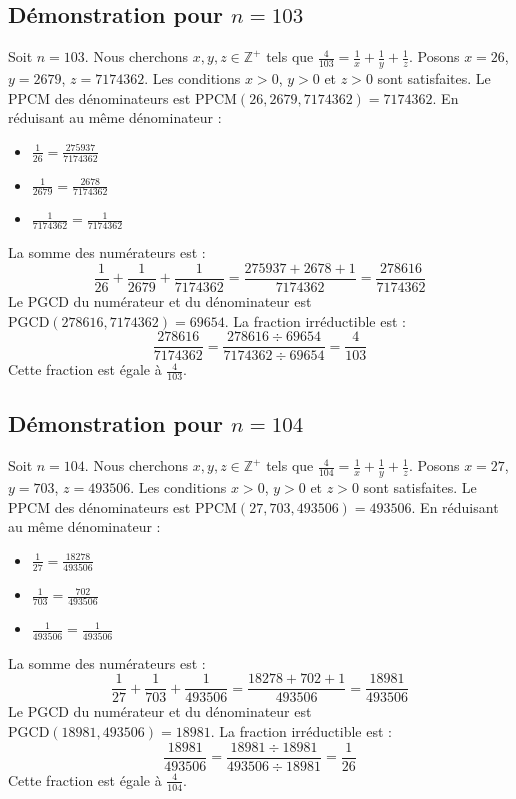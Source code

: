 \documentclass[11pt,a4paper]{article}
\begin{document}
\subsection{Démonstration pour $n = 103$}
Soit $n = 103$. Nous cherchons $x, y, z \in \mathbb{Z}^{+}$ tels que $\frac{4}{103} = \frac{1}{x} + \frac{1}{y} + \frac{1}{z}$.
Posons $x = 26$, $y = 2679$, $z = 7174362$.
Les conditions $x > 0$, $y > 0$ et $z > 0$ sont satisfaites.
Le PPCM des dénominateurs est $\text{PPCM}(26, 2679, 7174362) = 7174362$.
En réduisant au même dénominateur :
\begin{itemize}
    \item $\frac{1}{26} = \frac{275937}{7174362}$
    \item $\frac{1}{2679} = \frac{2678}{7174362}$
    \item $\frac{1}{7174362} = \frac{1}{7174362}$
\end{itemize}
La somme des numérateurs est :
$$ \frac{1}{26} + \frac{1}{2679} + \frac{1}{7174362} = \frac{275937 + 2678 + 1}{7174362} = \frac{278616}{7174362} $$
Le PGCD du numérateur et du dénominateur est $\text{PGCD}(278616, 7174362) = 69654$.
La fraction irréductible est :
$$ \frac{278616}{7174362} = \frac{278616 \div 69654}{7174362 \div 69654} = \frac{4}{103} $$
Cette fraction est égale à $\frac{4}{103}$.

\subsection{Démonstration pour $n = 104$}
Soit $n = 104$. Nous cherchons $x, y, z \in \mathbb{Z}^{+}$ tels que $\frac{4}{104} = \frac{1}{x} + \frac{1}{y} + \frac{1}{z}$.
Posons $x = 27$, $y = 703$, $z = 493506$.
Les conditions $x > 0$, $y > 0$ et $z > 0$ sont satisfaites.
Le PPCM des dénominateurs est $\text{PPCM}(27, 703, 493506) = 493506$.
En réduisant au même dénominateur :
\begin{itemize}
    \item $\frac{1}{27} = \frac{18278}{493506}$
    \item $\frac{1}{703} = \frac{702}{493506}$
    \item $\frac{1}{493506} = \frac{1}{493506}$
\end{itemize}
La somme des numérateurs est :
$$ \frac{1}{27} + \frac{1}{703} + \frac{1}{493506} = \frac{18278 + 702 + 1}{493506} = \frac{18981}{493506} $$
Le PGCD du numérateur et du dénominateur est $\text{PGCD}(18981, 493506) = 18981$.
La fraction irréductible est :
$$ \frac{18981}{493506} = \frac{18981 \div 18981}{493506 \div 18981} = \frac{1}{26} $$
Cette fraction est égale à $\frac{4}{104}$.
\end{document}
